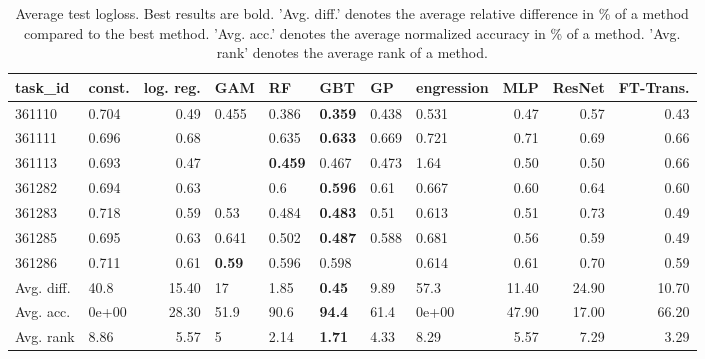 \begin{table}[ht!]
\centering
\begingroup\footnotesize
\begin{tabular}{llrlllllrrr}
  \hline
\hline
task\_id & const. & log. reg. & GAM & RF & GBT & GP & engression & MLP & ResNet & FT-Trans. \\ 
  \hline
361110 & 0.704 & 0.49 & 0.455 & 0.386 & \textbf{0.359} & 0.438 & 0.531 & 0.47 & 0.57 & 0.43 \\ 
  361111 & 0.696 & 0.68 &  & 0.635 & \textbf{0.633} & 0.669 & 0.721 & 0.71 & 0.69 & 0.66 \\ 
  361113 & 0.693 & 0.47 &  & \textbf{0.459} & 0.467 & 0.473 & 1.64 & 0.50 & 0.50 & 0.66 \\ 
  361282 & 0.694 & 0.63 &  & 0.6 & \textbf{0.596} & 0.61 & 0.667 & 0.60 & 0.64 & 0.60 \\ 
  361283 & 0.718 & 0.59 & 0.53 & 0.484 & \textbf{0.483} & 0.51 & 0.613 & 0.51 & 0.73 & 0.49 \\ 
  361285 & 0.695 & 0.63 & 0.641 & 0.502 & \textbf{0.487} & 0.588 & 0.681 & 0.56 & 0.59 & 0.49 \\ 
  361286 & 0.711 & 0.61 & \textbf{0.59} & 0.596 & 0.598 &  & 0.614 & 0.61 & 0.70 & 0.59 \\ 
   \hline
Avg. diff. & 40.8 & 15.40 & 17 & 1.85 & \textbf{0.45} & 9.89 & 57.3 & 11.40 & 24.90 & 10.70 \\ 
  Avg. acc. & 0e+00 & 28.30 & 51.9 & 90.6 & \textbf{94.4} & 61.4 & 0e+00 & 47.90 & 17.00 & 66.20 \\ 
  Avg. rank & 8.86 & 5.57 & 5 & 2.14 & \textbf{1.71} & 4.33 & 8.29 & 5.57 & 7.29 & 3.29 \\ 
   \hline
\hline
\end{tabular}
\endgroup
\caption{Average test logloss. 
                  Best results are bold. 
                  'Avg. diff.' denotes the average relative difference in \% of a method compared to the best method.
                  'Avg. acc.' denotes the average normalized accuracy in \% of a method.
                  'Avg. rank' denotes the average rank of a method.} 
\label{TABLES/table_results_logloss_gower_num_and_cat_features}
\end{table}
